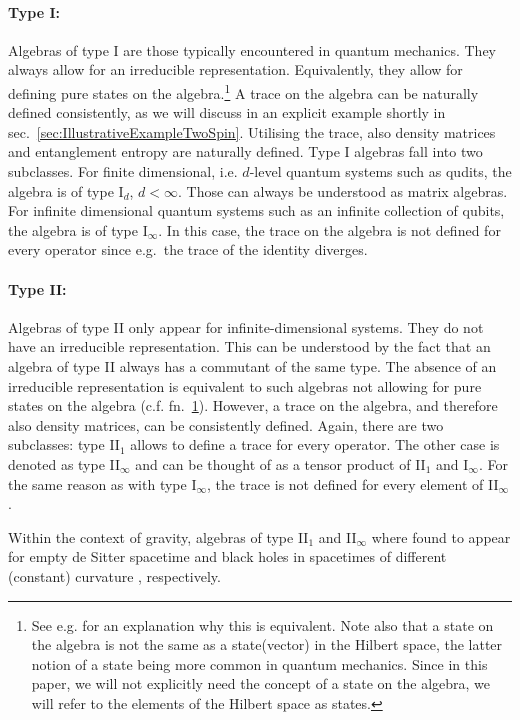 \documentclass[a4paper,11pt]{article}
\newcommand{\1}{\mathds{1}}
\begin{document}
\paragraph{Type I:}Algebras of type I are those typically encountered in quantum mechanics. They always allow for an irreducible representation. Equivalently, they allow for defining pure states on the algebra.\footnote{See e.g. \cite{Witten:2021jzq} for an explanation why this is equivalent. Note also that a state on the algebra is not the same as a state(vector) in the Hilbert space, the latter notion of a state being more common in quantum mechanics. Since in this paper, we will not explicitly need the concept of a state on the algebra, we will refer to the elements of the Hilbert space as states.\label{fn:PureStates}} A trace on the algebra can be naturally defined consistently, as we will discuss in an explicit example shortly in sec.~\ref{sec:IllustrativeExampleTwoSpin}. Utilising the trace, also density matrices and entanglement entropy are naturally defined. Type I algebras fall into two subclasses. For finite dimensional, i.e. $d$-level quantum systems such as qudits, the algebra is of type I$_d$, $d<\infty$. Those can always be understood as matrix algebras. For infinite dimensional quantum systems such as an infinite collection of qubits, the algebra is of type I$_\infty$. In this case, the trace on the algebra is not defined for every operator since e.g.~the trace of the identity diverges.
\paragraph{Type II:} Algebras of type II only appear for infinite-dimensional systems. They do not have an irreducible representation. This can be understood by the fact that an algebra of type II always has a commutant of the same type. The absence of an irreducible representation is equivalent to such algebras not allowing for pure states on the algebra (c.f. fn.~\ref{fn:PureStates}). However, a trace on the algebra, and therefore also density matrices, can be consistently defined. Again, there are two subclasses: type II$_1$ allows to define a trace for every operator. The other case is denoted as type II$_\infty$ and can be thought of as a tensor product of II$_1$ and I$_\infty$. For the same reason as with type I$_\infty$, the trace is not defined for every element of II$_\infty$.

Within the context of gravity, algebras of type II$_1$ and II$_\infty$ where found to appear for empty de Sitter spacetime \cite{Chandrasekaran:2022cip} and black holes in spacetimes of different (constant) curvature \cite{Witten:2021unn,Chandrasekaran:2022cip,Chandrasekaran:2022eqq}, respectively.
\end{document}
